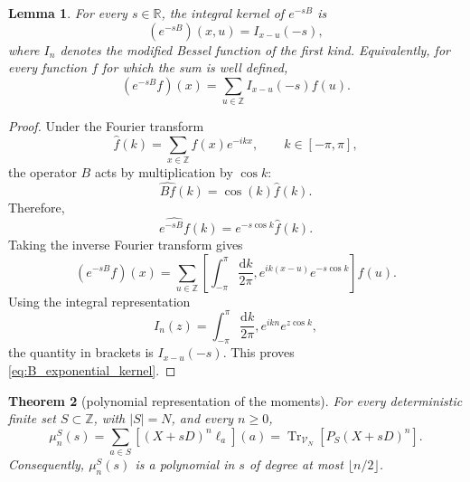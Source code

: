 \documentclass[11pt]{article}
\numberwithin{equation}{section}
\newtheorem{theorem}{Theorem}[section]
\newtheorem{lemma}[theorem]{Lemma}
\newcommand{\1}{\mathbf 1}
\begin{document}
\begin{lemma}
\label{lem:B_exponential_kernel}
For every $s\in\mathbb R$, the integral kernel of $e^{-sB}$ is
$$
\left(e^{-sB}\right)(x,u)
=
I_{x-u}(-s),
$$
where $I_n$ denotes the modified Bessel function of the first kind.
Equivalently, for every function $f$ for which the sum is well defined,
\begin{equation}
\left(e^{-sB}f\right)(x)
=
\sum_{u\in\mathbb Z}
I_{x-u}(-s)f(u).
\label{eq:B_exponential_kernel}
\end{equation}
\end{lemma}

\begin{proof}
Under the Fourier transform
$$
\widehat f(k)
=
\sum_{x\in\mathbb Z}f(x)e^{-ikx},
\qquad
k\in[-\pi,\pi],
$$
the operator $B$ acts by multiplication by $\cos k$:
$$
\widehat{Bf}(k)
=
\cos(k)\widehat f(k).
$$
Therefore,
$$
\widehat{e^{-sB}f}(k)
=
e^{-s\cos k}\widehat f(k).
$$
Taking the inverse Fourier transform gives
$$
\left(e^{-sB}f\right)(x)
=
\sum_{u\in\mathbb Z}
\left[
\int_{-\pi}^{\pi}
\frac{\mathrm dk}{2\pi},
e^{ik(x-u)}e^{-s\cos k}
\right]
f(u).
$$
Using the integral representation
$$
I_n(z)
=
\int_{-\pi}^{\pi}
\frac{\mathrm dk}{2\pi},
e^{ikn}e^{z\cos k},
$$
the quantity in brackets is $I_{x-u}(-s)$.  This proves
\eqref{eq:B_exponential_kernel}.
\end{proof}

\begin{theorem}[polynomial representation of the moments]
\label{prop:moment_operator_representation}
For every deterministic finite set \(S\subset\mathbb Z\), with \(|S|=N\), and
every \(n\geq0\),
\begin{equation}
    \mu_n^S(s)
    =
    \sum_{a\in S}
    \left[(X+sD)^n\ell_a\right](a)
    =  \operatorname{Tr}_{\mathcal V_N}
    \left[
    P_S(X+sD)^n
    \right].
\label{eq:moment_operator_representation}
\end{equation}
Consequently, \(\mu_n^S(s)\) is a polynomial in \(s\) of degree at most
\(\lfloor n/2\rfloor\).
\end{theorem}
\end{document}
